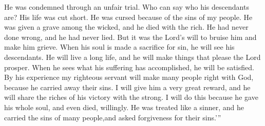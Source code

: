 He was condemned through an unfair trial. Who can say who his descendants are? His life was cut short. He was cursed because of the sins of my people.
\bverse \iffalse And he made his grave with the wicked, and with the rich in his death; because he had done no evil, neither was any deceit in his mouth. \fi
He was given a grave among the wicked, and he died with the rich. He had never done wrong, and he had never lied.
\bverse \iffalse Yet it pleased the Lord to bruise him; he hath put him to grief; when thou shalt make his soul an offering for sin he shall see his seed, he shall prolong his days, and the pleasure of the Lord shall prosper in his hand. \fi
But it was the Lord's will to bruise him and make him grieve. When his soul is made a sacrifice for sin, he will see his descendants. He will live a long life, and he will make things that please the Lord prosper.
\bverse \iffalse He shall see the travail of his soul, and shall be satisfied; by his knowledge shall my righteous servant justify many; for he shall bear their iniquities. \fi
When he sees what his suffering has accomplished, he will be satisfied. By his experience my righteous servant will make many people right with God, because he carried away their sins.
\bverse \iffalse Therefore will I divide him a portion with the great, and he shall divide the spoil with the strong; because he hath poured out his soul unto death; and he was numbered with the transgressors; and he bore the sins of many, and made intercession for the transgressors. \fi
I will give him a very great reward, and he will share the riches of his victory with the strong. I will do this because he gave his whole soul, and even died, willingly. He was treated like a sinner, and he carried the sins of many people,and asked forgiveness for their sins.\rq ''

